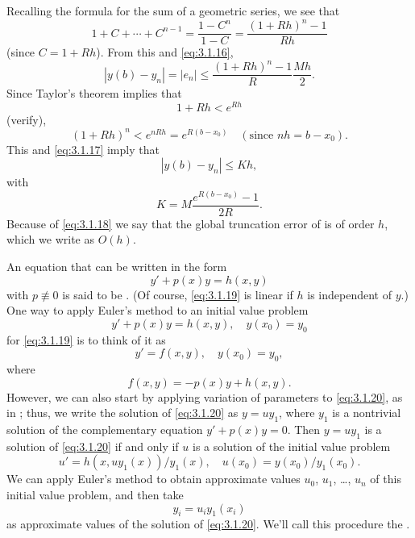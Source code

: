 Recalling the formula for the sum of a geometric series, we see that
\[
1+C+\cdots+C^{n-1}=\frac{1-C^n}{1-C}=\frac{(1+Rh)^n-1}{Rh}
\]
(since $C=1+Rh$). From this and \eqref{eq:3.1.16},
\begin{equation} \label{eq:3.1.17}
|y(b)-y_n|=|e_n|\le\frac{(1+Rh)^n-1}{R}\frac{Mh}{2}.
\end{equation}
Since Taylor's theorem implies that
\[
1+Rh<e^{Rh}
\]
(verify),
\[
(1+Rh)^n<e^{nRh}=e^{R(b-x_0)}\quad (\text{since }nh=b-x_0).
\]
This and \eqref{eq:3.1.17} imply that
\begin{equation} \label{eq:3.1.18}
|y(b)-y_n|\le Kh,
\end{equation}
with
\[
K=M\frac{e^{R(b-x_0)}-1}{2R}.
\]
Because of \eqref{eq:3.1.18} we say that the global truncation
error
of
 is of order $h$, which we write as $O(h)$.



An equation that can be written in the form
\begin{equation} \label{eq:3.1.19}
y'+p(x)y=h(x,y)
\end{equation}
with $p\not\equiv0$ is said to be . (Of course,
\eqref{eq:3.1.19} is linear if $h$ is independent of $y$.) One way to
apply Euler's method to an initial value problem
\begin{equation} \label{eq:3.1.20}
y'+p(x)y=h(x,y),\quad y(x_0)=y_0
\end{equation}
for \eqref{eq:3.1.19} is to think of it  as
\[
y'=f(x,y),\quad y(x_0)=y_0,
\]
where
\[
f(x,y)=-p(x)y+h(x,y).
\]
However, we can also start by applying variation of parameters to
\eqref{eq:3.1.20}, as in
;
thus, we
write the solution of \eqref{eq:3.1.20} as $y=uy_1$, where $y_1$ is a
nontrivial solution of the complementary equation $y'+p(x)y=0$. Then
$y=uy_1$ is a solution of \eqref{eq:3.1.20} if and only if $u$ is a
solution of the initial value problem
\begin{equation} \label{eq:3.1.21}
u'=h(x,uy_1(x))/y_1(x),\quad u(x_0)=y(x_0)/y_1(x_0).
\end{equation}
We can apply Euler's method to obtain approximate values
$u_0$, $u_1$, \dots, $u_n$ of this initial value problem, and then take
\[
y_i=u_iy_1(x_i)
\]
as approximate values of the solution of \eqref{eq:3.1.20}.
We'll call this procedure the
.

